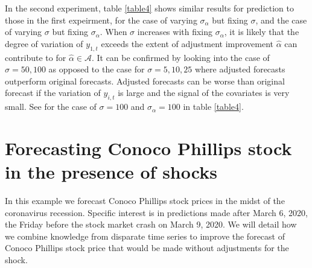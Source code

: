 \documentclass[11pt]{article}
\def\mc#1{\mathcal{#1}} %
\theoremstyle{definition}
\begin{document}
In the second experiment, table \ref{table4} shows similar results for prediction to those in the first expeirment, for the case of varying $\sigma_{\alpha}$ but fixing $\sigma$, and the case of varying $\sigma$ but fixing $\sigma_{\alpha}$. When $\sigma$ increases with fixing $\sigma_{\alpha}$, it is likely that the degree of variation of $y_{1,t}$ exceeds the extent of adjustment improvement $\hat{\alpha}$ can contribute to for $\hat{\alpha}\in \mc{A}$. It can be confirmed by looking into  the case of $\sigma= 50, 100$ as opposed to the case for $\sigma= 5, 10, 25$ where adjusted forecasts outperform original forecasts. Adjusted forecasts can be worse than original forecast if the variation of $y_{i,t}$ is large and the signal of the covariates is very small. See for the case  of $\sigma=100$ and $\sigma_{\alpha}=100$ in table \ref{table4}. 














\section{Forecasting Conoco Phillips stock in the presence of shocks}
\label{forecasting}
In this example we forecast Conoco Phillips stock prices in the midst of the coronavirus recession. Specific interest is in predictions made after March 6, 2020, the Friday before the stock market crash on March 9, 2020. We will detail how we combine knowledge from disparate time series to improve the forecast of Conoco Phillips stock price that would be made without adjustments for the shock. %
\end{document}

